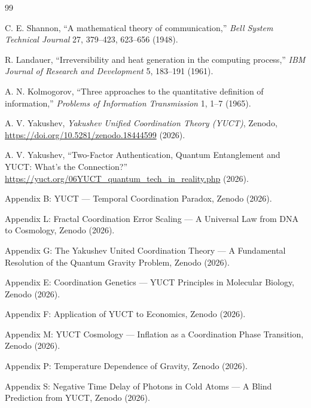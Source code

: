 \documentclass[12pt,a4paper]{article}
\theoremstyle{remark}
\begin{document}
	\begin{thebibliography}{99}
		
		C. E. Shannon, ``A mathematical theory of communication,'' \emph{Bell System Technical Journal} 27, 379–423, 623–656 (1948).
		
		R. Landauer, ``Irreversibility and heat generation in the computing process,'' \emph{IBM Journal of Research and Development} 5, 183–191 (1961).
		
		A. N. Kolmogorov, ``Three approaches to the quantitative definition of information,'' \emph{Problems of Information Transmission} 1, 1–7 (1965).
		
		A. V. Yakushev, \emph{Yakushev Unified Coordination Theory (YUCT)}, Zenodo, \url{https://doi.org/10.5281/zenodo.18444599} (2026).
		
		A. V. Yakushev, ``Two-Factor Authentication, Quantum Entanglement and YUCT: What's the Connection?'' \url{https://yuct.org/06YUCT_quantum_tech_in_reality.php} (2026).
		
		Appendix B: YUCT — Temporal Coordination Paradox, Zenodo (2026).
		
		Appendix L: Fractal Coordination Error Scaling — A Universal Law from DNA to Cosmology, Zenodo (2026).
		
		Appendix G: The Yakushev United Coordination Theory — A Fundamental Resolution of the Quantum Gravity Problem, Zenodo (2026).
		
		Appendix E: Coordination Genetics — YUCT Principles in Molecular Biology, Zenodo (2026).
		
		Appendix F: Application of YUCT to Economics, Zenodo (2026).
		
		Appendix M: YUCT Cosmology — Inflation as a Coordination Phase Transition, Zenodo (2026).
		
		Appendix P: Temperature Dependence of Gravity, Zenodo (2026).
		
		Appendix S: Negative Time Delay of Photons in Cold Atoms — A Blind Prediction from YUCT, Zenodo (2026).
		
	\end{thebibliography}
	
\end{document}
